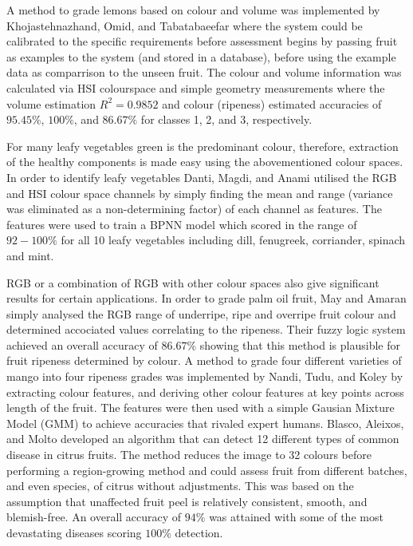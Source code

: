\documentclass[fleqn,twoside,12pt]{report}
\begin{document}
A method to grade lemons based on colour and volume was implemented by Khojastehnazhand, Omid, and Tabatabaeefar \cite{khojastehnazhand} where the system could be calibrated to the specific requirements before assessment begins by passing fruit as examples to the system (and stored in a database), before using the example data as comparrison to the unseen fruit. The colour and volume information was calculated via HSI colourspace and simple geometry measurements where the volume estimation $R^2 = 0.9852$ and colour (ripeness) estimated accuracies of $95.45\%$, $100\%$, and $86.67\%$ for classes 1, 2, and 3, respectively.

For many leafy vegetables green is the predominant colour, therefore, extraction of the healthy components is made easy using the abovementioned colour spaces. In order to identify leafy vegetables Danti, Magdi, and Anami \cite{danti} utilised the RGB and HSI colour space channels by simply finding the mean and range (variance was eliminated as a non-determining factor) of each channel as features. The features were used to train a BPNN model which scored in the range of $92-100\%$ for all 10 leafy vegetables including dill, fenugreek, corriander, spinach and mint. 

RGB or a combination of RGB with other colour spaces also give significant results for certain applications. In order to grade palm oil fruit, May and Amaran \cite{may} simply analysed the RGB range of underripe, ripe and overripe fruit colour and determined accociated values correlating to the ripeness. Their fuzzy logic system achieved an overall accuracy of $86.67\%$ showing that this method is plausible for fruit ripeness determined by colour. A method to grade four different varieties of mango into four ripeness grades was implemented by Nandi, Tudu, and Koley \cite{nandi} by extracting colour features, and deriving other colour features at key points across length of the fruit. The features were then used with a simple Gausian Mixture Model (GMM) to achieve accuracies that rivaled expert humans. Blasco, Aleixos, and Molto \cite{blasco2} developed an algorithm that can detect 12 different types of common disease in citrus fruits. The method reduces the image to 32 colours before performing a region-growing method and could assess fruit from different batches, and even species, of citrus without adjustments. This was based on the assumption that unaffected fruit peel is relatively consistent, smooth, and blemish-free. An overall accuracy of $94\%$ was attained with some of the most devastating diseases scoring $100\%$ detection. 
\end{document}
